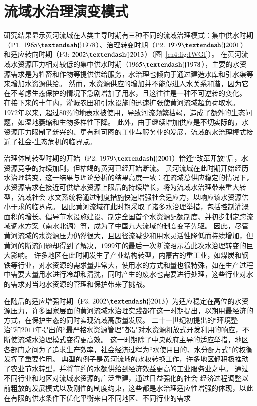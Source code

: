 \section{流域水治理演变模式}

研究结果显示黄河流域在人类主导时期有三种不同的流域治理模式：集中供水时期（P1: $1965 \textendash{} 1978$）、治理转变时期（P2: $1979 \textendash{} 2001$）和适应转向时期（P3: $2002 \textendash{} 2013$）（图~\ref{ch4:fig:IWGI}）。
在黄河流域水资源压力相对较低的集中供水时期（$1965 \textendash{} 1978$），主要的水资源需求是为牲畜和作物等提供供给服务，水治理也倾向于通过建造水库和引水渠等来增加水资源供给。
然而，水资源供应的增加并不能促进人\textendash{}水关系和谐，因为它在不考虑生态保护的情况下急剧增加了用水，且这往往是一种不可逆转的变化\cite{zhou2020}。
在接下来的十年内，灌溉农田和引水设施的迅速扩张使黄河流域超负荷取水。
1972年以来，超过$80\%$的地表水被使用，导致河流频繁枯竭，造成了额外的生态问题，如湿地萎缩和生物多样性下降\cite{wang2019c}。
此外，由于继续增加供应是不切实际的，水资源压力限制了新兴的、更有利可图的工业与服务业的发展，流域的水治理模式接近了社会-生态危机的临界点\cite{loch2020, wohlfart2016}。

治理体制转型时期的开始（P2: $1979 \textendash{} 2001$）恰逢“改革开放”后，水资源竞争的持续加剧，但枯竭的黄河已经开始断流。
黄河流域在此时期开始经历水治理转变，这一结果与理论分析的结果高度一致：在流域总供应稳定的情况下，水资源需求在接近可供给水资源上限后的持续增长，将为流域水治理带来重大转型，流域社会-水文系统将通过制度措施快速增强社会适应力，以响应该水资源供小于求的临界点\cite{loch2020}。
因此黄河流域在此时期采取了诸多水治理举措，包括控制灌溉面积的增长、倡导节水设施建设、制定全国首个水资源配额制度、并初步制定跨流域调水方案（南水北调）等\cite{wang2019b,long2020,nickum2021}，成为了中国九大流域的制度变革先驱。
因此，尽管黄河流域的水资源压力仍然很大，且因径流减少和用水灵活性降低而持续增加，但黄河的断流问题却得到了解决，$1999$年的最后一次断流昭示着此次水治理转变的巨大影响\cite{wang2019b}。
许多地区在此时期发生了产业结构转型，内蒙古的重工业，如煤炭和钢铁等行业，对水资源的需求量非常大，使用水的方式和量也很特殊，如在生产过程中需要大量用水进行冷却和清洗，同时产生的废水也需要进行处理，这些行业对水的需求对当地水资源的管理和保护带来了挑战。

在随后的适应增强时期（P3: $2002 \textendash{} 2013$）为适应稳定在高位的水资源压力，许多国家层面的黄河流域水治理实践都在这一时期提出，以期用最经济的方式，在保护生态的同时实现流域高质量发展。
二十一世纪初提出的“环境整治”和$2011$年提出的“最严格水资源管理”都是对水资源粗放式开发利用的响应，不断使流域水治理模式变得更高效。
这一时期除了中央政府主导的适应举措，地区各部门之间为了追求生产效率，社会经济过程为“水使用目的、水分配方式”的权衡发挥了重要作用。
典型的例子是黄河流域的水权转换工作，许多地区都积极推动了农业节水转型，并将节约的水额供给到经济效益更高的工业服务业之中。
通过不同行业和地区对流域水资源的广泛重建，通过日益强化的社会-经济过程调整以前粗放的发展模式以及刚性的制度约束，这些都是水治理适应性增强的体现，以此在有限的供水条件下优化平衡来自不同地区、不同行业的需求\cite{dalin2015,song2022}

